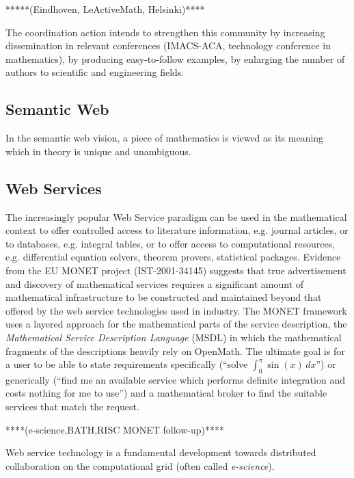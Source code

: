 \documentclass[draft]{artikel3}
\begin{document}
*****(Eindhoven, LeActiveMath, Helsinki)****

The coordination action intends to strengthen this community by
increasing dissemination in relevant conferences (IMACS-ACA,
technology conference in mathematics), by producing easy-to-follow
examples, by enlarging the number of authors to scientific and
engineering fields.



\subsection{Semantic Web}
\label{sec:semw}

In the semantic web vision, a piece of mathematics is viewed as its
meaning which in theory is unique and unambiguous.




\subsection{Web Services}
\label{sec:ws}

The increasingly popular Web Service paradigm can be used in the
mathematical context to offer controlled access to literature
information, e.g. journal articles, or to databases, e.g. integral
tables, or to offer access to computational resources, e.g.
differential equation solvers, theorem provers, statistical packages.
Evidence from the EU MONET project (IST-2001-34145) suggests that true
advertisement and discovery of mathematical services requires a
significant amount of mathematical infrastructure to be constructed
and maintained beyond that offered by the web service technologies
used in industry.  The MONET framework uses a layered approach for the
mathematical parts of the service description, the \emph{Mathematical
  Service Description Language} (MSDL) in which the mathematical
fragments of the descriptions heavily rely on OpenMath.  The ultimate
goal is for a user to be able to state requirements specifically
(``solve $\int_0^\pi{}\sin(x)\,dx$'') or generically (``find me an
available service which performs definite integration and costs
nothing for me to use'') and a mathematical broker to find the
suitable services that match the request.

****(e-science,BATH,RISC MONET follow-up)****

Web service technology is a fundamental development towards
distributed collaboration on the computational grid (often called
\emph{e-science}).  
\end{document}
